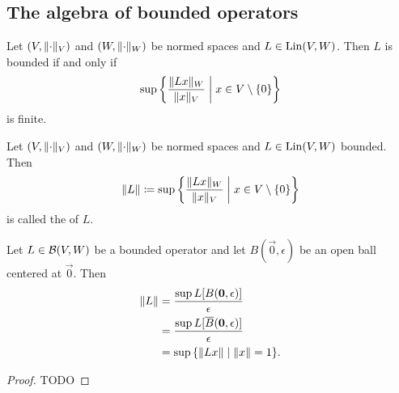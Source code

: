 \subsection{The algebra of bounded operators}
\begin{lemma} \label{existenceOperatorNorm}
Let $(V,\lVert\cdot\rVert_V)$ and $(W,\lVert\cdot\rVert_W)$ be normed spaces and $L\in\operatorname{Lin}(V, W)$. Then $L$ is bounded \textup{if and only if}
\[ \sup\setbuilder{\frac{\norm{Lx}_W}{\norm{x}_V}}{x\in V\setminus\{0\}} \] 
is finite.
\end{lemma}
\begin{definition}
Let $(V,\lVert\cdot\rVert_V)$ and $(W,\lVert\cdot\rVert_W)$ be normed spaces and $L\in\operatorname{Lin}(V, W)$ bounded. Then
\[ \norm{L} \defeq \sup\setbuilder{\frac{\norm{Lx}_W}{\norm{x}_V}}{x\in V\setminus\{0\}} \]
is called the  of $L$.
\end{definition}

\begin{proposition} \label{operatorNorm}
Let $L\in\operatorname{\mathcal{B}}(V,W)$ be a bounded operator and let $B(\vec{0},\epsilon)$ be an open ball centered at $\vec{0}$. Then
\begin{align*}
\norm{L} &= \frac{\sup L[B(\vec{0},\epsilon)]}{\epsilon} \\
&= \frac{\sup L[\overline{B}(\vec{0},\epsilon)]}{\epsilon} \\
&= \sup\setbuilder{\norm{Lx}}{\norm{x} = 1}.
\end{align*}
\end{proposition}
\begin{proof}
TODO
\end{proof}

